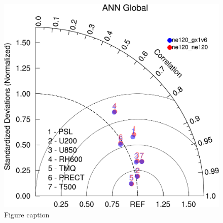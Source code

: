 \documentclass[draft,ms]{AGUTeX}
\begin{document}

%
%
%
%
%
%


\newpage

\begin{figure}
\includegraphics[width=0.7\linewidth]{taylor_globe_ANN.pdf}
\caption{Figure caption}
\label{fig:taylor_global}
\end{figure}
\end{document}
